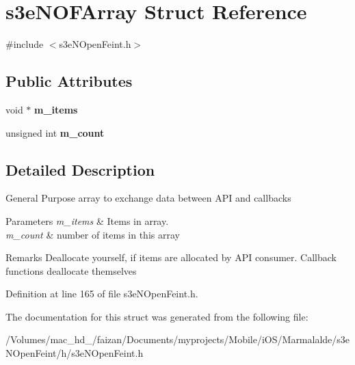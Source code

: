 \hypertarget{structs3e_n_o_f_array}{
\section{s3eNOFArray Struct Reference}
\label{structs3e_n_o_f_array}
}


{\ttfamily \#include $<$s3eNOpenFeint.h$>$}

\subsection*{Public Attributes}
\begin{DoxyCompactItemize}
\item 
\hypertarget{structs3e_n_o_f_array_ade3e4e3e8e472baf7728664230385c90}{
void $\ast$ {\bfseries m\_\-items}}
\label{structs3e_n_o_f_array_ade3e4e3e8e472baf7728664230385c90}

\item 
\hypertarget{group___n_open_feint_api_group_gaa30bf01aa490f0e36cc36c2b390037f0}{
unsigned int {\bfseries m\_\-count}}
\label{group___n_open_feint_api_group_gaa30bf01aa490f0e36cc36c2b390037f0}

\end{DoxyCompactItemize}


\subsection{Detailed Description}
General Purpose array to exchange data between API and callbacks 
\begin{DoxyParams}{Parameters}
{\em m\_\-items} & Items in array. \\
\hline
{\em m\_\-count} & number of items in this array \\
\hline
\end{DoxyParams}
\begin{DoxyRemark}{Remarks}
Deallocate yourself, if items are allocated by API consumer. Callback functions deallocate themselves 
\end{DoxyRemark}


Definition at line 165 of file s3eNOpenFeint.h.



The documentation for this struct was generated from the following file:\begin{DoxyCompactItemize}
\item 
/Volumes/mac\_\-hd\_/faizan/Documents/myprojects/Mobile/iOS/Marmalalde/s3eNOpenFeint/h/s3eNOpenFeint.h\end{DoxyCompactItemize}
